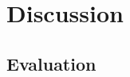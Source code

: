 \chapter{Discussion}
\label{cha:discussion}

\section{Evaluation}
\label{sec:evaluation}

\begin{comment}
When evaluating your results, avoid drawing grand conclusions, beyond those that your results can in fact support.
Further, although you may have designed your experiments to answer certain questions,
the results may raise other questions in the eyes of the reader.
It is important that you study the graphs/tables to look for unusual features/entries, and discuss these as well as the main findings.
In particular, carry out an error analysis: What went wrong and why?

A confusion matrix can, for example, be a good way to display misclassifications.
Figure~\ref{fig:conf_sentiment} (on Page~\pageref{fig:conf_sentiment}) shows two confusion matrices.
If there were perfect correlation between true and predicted labels, the long diagonals (from the upper left to the lower right corner) would be completely red.
However,  the confusion matrices indicate
that this classifier was quite biased towards the neutral label (illustrated with \Neutrey),
as can be seen from the warm colours in the positive (\Smiley) and negative (\Sadey) true label cells of the \Neutrey predicted label column.

\pgfplotsset{
    colormap={whitehot}{color(0cm)=(white); color(1cm)=(yellow); color(2cm)=(orange); color(3cm)=(red)},
    confusionaxis/.style={
            colorbar,
            colorbar style={
                    width=2mm,
                    at={(1.05,1)},
                },
            colormap name=whitehot,
            faceted color=none, %
            view={0}{90},
            y dir=reverse,
            xlabel=Predicted label,
            ylabel=True label,
            tick style={draw=none},
            yticklabels={,,},
            xticklabels={,,},
            every node=[font=\small],
            extra x ticks={0.4,1.5,2.6},
            extra x tick labels={\Smiley, \Neutrey, \Sadey},
            extra y ticks={0.3,1.5,2.7},
            extra y tick labels={\Smiley, \Neutrey, \Sadey},
            extra x tick style={
                    x tick label style={
                            font=\Large
                        }
                },
            extra y tick style={
                    y tick label style={
                            font=\Large
                        }
                },
            width=.4\linewidth,
        }
}


\end{comment}
